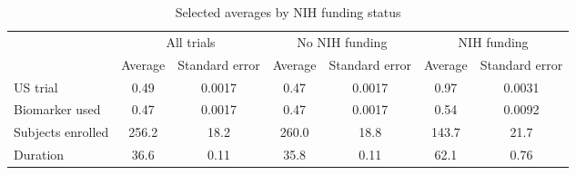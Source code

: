 \begin{table}[htbp]\centering
\def\sym#1{\ifmmode^{#1}\else\(^{#1}\)\fi}
\caption{Selected averages by NIH funding status}
\begin{tabular}{l*{3}{cc}}
\hline\hline
          &\multicolumn{2}{c}{All trials}&\multicolumn{2}{c}{No NIH funding}&\multicolumn{2}{c}{NIH funding}\\
          &  Average&Standard error&  Average&Standard error&  Average&Standard error\\
\hline
US trial  &     0.49&   0.0017&     0.47&   0.0017&     0.97&   0.0031\\
Biomarker used&     0.47&   0.0017&     0.47&   0.0017&     0.54&   0.0092\\
Subjects enrolled&    256.2&     18.2&    260.0&     18.8&    143.7&     21.7\\
Duration  &     36.6&     0.11&     35.8&     0.11&     62.1&     0.76\\
\hline\hline
\end{tabular}
\end{table}
